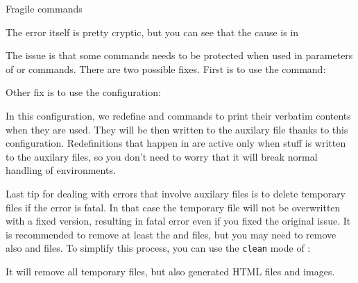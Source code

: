 \begin{issue}{Fragile commands}
\begin{shellcommand}
! Argument of \im:g has an extra }.
<inserted text> 
                \par 
l.7 ...egin{array}{c c} hello & world\end{array}}
\end{shellcommand}

The error itself is pretty cryptic, but you can see that the cause is in 

\begin{texsource}
\caption{$\begin{array}{c c} hello & world\end{array}$}
\end{texsource}

The issue is that some commands needs to be protected when used in parameters of \texcommand{\section}
or \texcommand{\caption} commands. There are two possible fixes. First is to use the \texcommand{\protect}
command:

\begin{texsource}
\caption{$\protect\begin{array}{c c} hello & world\protect\end{array}$}
\end{texsource}

Other fix is to use the  configuration:

\begin{texsource}
\end{texsource}

In this configuration, we redefine \texcommand{\begin} and \texcommand{\end} commands to print
their verbatim contents when they are used. They will be then written to the auxilary file
thanks to this configuration.
Redefinitions that happen in  are active only when stuff is written to the auxilary
files, so you don't need to worry that it will break normal handling of environments.

Last tip for dealing with errors that involve auxilary files is to delete temporary files if the 
error is fatal. In that case the temporary file will not be overwritten with a fixed version, 
resulting in fatal error even if you fixed the original issue. It is recommended to remove at least 
the  and  files, but you may need to remove also  and  files.
To simplify this process, you can use the \texttt{clean} mode of \makefourht:


It will remove all temporary files, but also generated HTML files and images.

\end{issue}


